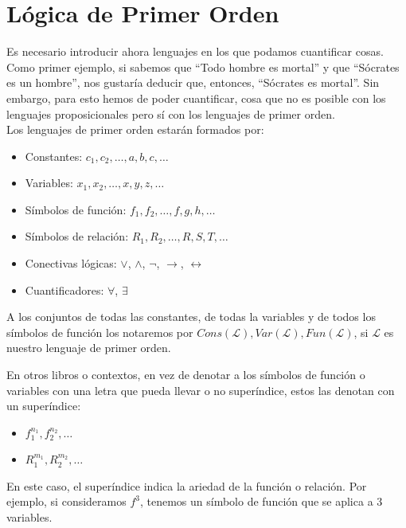 \chapter{Lógica de Primer Orden}
Es necesario introducir ahora lenguajes en los que podamos cuantificar cosas. Como primer ejemplo, si sabemos que ``Todo hombre es mortal'' y que ``Sócrates es un hombre'', nos gustaría deducir que, entonces, ``Sócrates es mortal''. Sin embargo, para esto hemos de poder cuantificar, cosa que no es posible con los lenguajes proposicionales pero sí con los lenguajes de primer orden.\\

\noindent
Los lenguajes de primer orden estarán formados por:
\begin{itemize}
    \item Constantes: $c_1,c_2,\ldots, a,b,c,\ldots$
    \item Variables: $x_1,x_2,\ldots, x,y,z,\ldots$
    \item Símbolos de función: $f_1, f_2, \ldots, f,g,h, \ldots$
    \item Símbolos de relación: $R_1,R_2,\ldots,R,S,T,\ldots$
    \item Conectivas lógicas: $\lor$, $\land$, $\lnot$, $\to$, $\leftrightarrow $
    \item Cuantificadores: $\forall $, $\exists $
\end{itemize}

A los conjuntos de todas las constantes, de todas la variables y de todos los símbolos de función los notaremos por $Cons(\mathcal{L}), Var(\mathcal{L}), Fun(\mathcal{L})$, si $\mathcal{L}$ es nuestro lenguaje de primer orden.

\begin{notacion}
    En otros libros o contextos, en vez de denotar a los símbolos de función o variables con una letra que pueda llevar o no superíndice, estos las denotan con un superíndice:
    \begin{itemize}
        \item $f_1^{n_1},f_2^{n_2},\ldots$
        \item $R_1^{m_1},R_2^{m_2},\ldots$
    \end{itemize}
    En este caso, el superíndice indica la ariedad de la función o relación. Por ejemplo, si consideramos $f^3$, tenemos un símbolo de función que se aplica a 3 variables.
\end{notacion}

